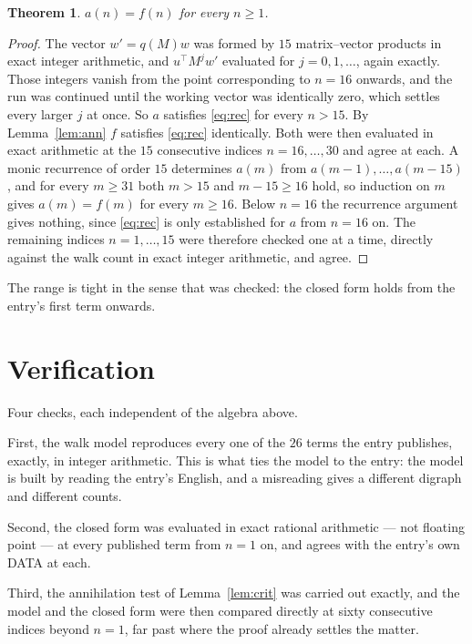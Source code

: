 \documentclass[11pt,a4paper]{article}
\theoremstyle{plain}
\newtheorem{theorem}{Theorem}
\theoremstyle{definition}
\begin{document}
\begin{theorem}
$a(n)=f(n)$ for every $n\ge1$.
\end{theorem}

\begin{proof}
The vector $w'=q(M)w$ was formed by $15$ matrix--vector products in exact integer
arithmetic, and $u^{\!\top}M^{j}w'$ evaluated for $j=0,1,\dots$, again exactly. Those integers
vanish from the point corresponding to $n=16$ onwards, and the run was continued until the
working vector was identically zero, which settles every larger $j$ at once. So $a$ satisfies
\eqref{eq:rec} for every $n>15$. By Lemma~\ref{lem:ann} $f$ satisfies \eqref{eq:rec}
identically. Both were then evaluated in exact arithmetic at the $15$ consecutive indices
$n=16,\dots,30$ and agree at each. A monic recurrence of order $15$
determines $a(m)$ from $a(m-1),\dots,a(m-15)$, and for every $m\ge31$ both
$m>15$ and $m-15\ge16$ hold, so induction on $m$ gives $a(m)=f(m)$ for every
$m\ge16$.
Below $n=16$ the recurrence argument gives nothing, since \eqref{eq:rec} is only
established for $a$ from $n=16$ on. The remaining indices $n=1,\dots,15$ were
therefore checked one at a time, directly against the walk count in exact integer arithmetic,
and agree.
\end{proof}

The range is tight in the sense that was checked: the closed form holds from the entry's first term onwards.

\section{Verification}

Four checks, each independent of the algebra above.

First, the walk model reproduces every one of the $26$ terms the entry publishes,
exactly, in integer arithmetic. This is what ties the model to the entry: the model is built
by reading the entry's English, and a misreading gives a different digraph and different
counts.

Second, the closed form was evaluated in exact rational arithmetic --- not floating point ---
at every published term from $n=1$ on, and agrees with the entry's own DATA at each.

Third, the annihilation test of Lemma~\ref{lem:crit} was carried out exactly, and the model
and the closed form were then compared directly at sixty consecutive indices beyond
$n=1$, far past where the proof already settles the matter.
\end{document}
